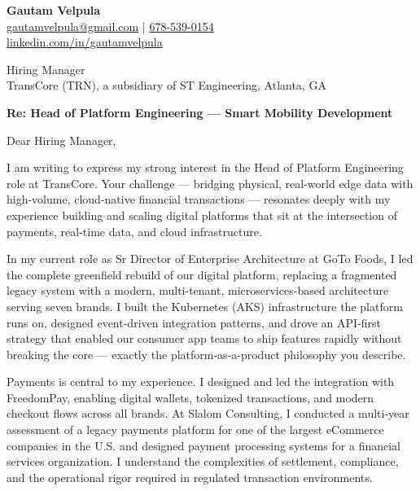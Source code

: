 \documentclass[11pt]{article}
\begin{document}
\begin{flushleft}
\textbf{Gautam Velpula} \\
\href{mailto:gautamvelpula@gmail.com}{gautamvelpula@gmail.com} \;|\;
\href{tel:6785390154}{678-539-0154} \\
\href{https://www.linkedin.com/in/gautamvelpula}{linkedin.com/in/gautamvelpula}
\end{flushleft}

\vspace{12pt}

\begin{flushleft}
Hiring Manager \\
TransCore (TRN), a subsidiary of ST Engineering, Atlanta, GA
\end{flushleft}

\vspace{12pt}

\textbf{Re: Head of Platform Engineering --- Smart Mobility Development}

\vspace{12pt}

Dear Hiring Manager,

I am writing to express my strong interest in the Head of Platform Engineering role at TransCore. Your challenge --- bridging physical, real-world edge data with high-volume, cloud-native financial transactions --- resonates deeply with my experience building and scaling digital platforms that sit at the intersection of payments, real-time data, and cloud infrastructure.

In my current role as Sr Director of Enterprise Architecture at GoTo Foods, I led the complete greenfield rebuild of our digital platform, replacing a fragmented legacy system with a modern, multi-tenant, microservices-based architecture serving seven brands. I built the Kubernetes (AKS) infrastructure the platform runs on, designed event-driven integration patterns, and drove an API-first strategy that enabled our consumer app teams to ship features rapidly without breaking the core --- exactly the platform-as-a-product philosophy you describe.

Payments is central to my experience. I designed and led the integration with FreedomPay, enabling digital wallets, tokenized transactions, and modern checkout flows across all brands. At Slalom Consulting, I conducted a multi-year assessment of a legacy payments platform for one of the largest eCommerce companies in the U.S. and designed payment processing systems for a financial services organization. I understand the complexities of settlement, compliance, and the operational rigor required in regulated transaction environments.
\end{document}
